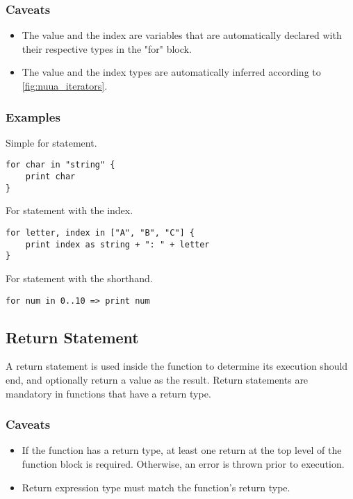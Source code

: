 \subsubsection{Caveats}

\begin{itemize}
    \item The value and the index are variables that are automatically declared with their respective types in the "for" block.
    \item The value and the index types are automatically inferred according to \autoref{fig:nuua_iterators}.
\end{itemize}

\subsubsection{Examples}

Simple for statement.
\begin{lstlisting}
for char in "string" {
    print char
}
\end{lstlisting}
For statement with the index.
\begin{lstlisting}
for letter, index in ["A", "B", "C"] {
    print index as string + ": " + letter
}
\end{lstlisting}
For statement with the shorthand.
\begin{lstlisting}
for num in 0..10 => print num
\end{lstlisting}

\subsection{Return Statement}

A return statement is used inside the function to determine its execution should end, and optionally return a value as the result.
Return statements are mandatory in functions that have a return type.

\subsubsection{Caveats}

\begin{itemize}
    \item If the function has a return type, at least one return at the top level of the function block is required. Otherwise, an error
        is thrown prior to execution.
    \item Return expression type must match the function's return type.
\end{itemize}

